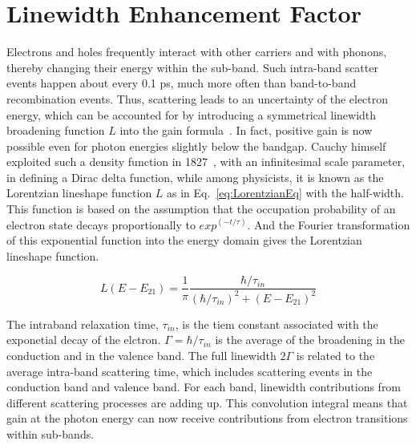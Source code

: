 \section{Linewidth Enhancement Factor} \label{Linewidth}

Electrons and holes frequently interact with other carriers and with phonons,
thereby changing their energy within the sub-band. Such intra-band scatter
events happen about every 0.1 ps, much more often than band-to-band
recombination events. Thus, scattering leads to an uncertainty of the electron
energy, which can be accounted for by introducing a symmetrical linewidth
broadening function $L$ into the gain formula~\cite{Piprek:2013wu}.  In fact,
positive gain is now possible even for photon energies slightly below the
bandgap. Cauchy himself exploited such a density function in
1827~\cite{stigler2002statistics}, with an infinitesimal scale parameter, in
defining a Dirac delta function, while among physicists, it is known as the
Lorentzian lineshape function $L$ as in Eq.~\ref{eq:LorentzianEq} with the
half-width. This function is based on the assumption that the occupation
probability of an electron state decays proportionally to
${exp}^{(-{t}/{\tau})}$. And the Fourier transformation of this exponential
function into the energy domain gives the Lorentzian lineshape function.

\begin{equation}
L(E-E_{21})=\frac{1}{\pi}\frac{\hbar/\tau_{in}}{{(\hbar/\tau_{in})}^2+{(E-E_{21})}^2}
\label{eq:LorentzianEq}
\end{equation}

The intraband relaxation time, $\tau_{in}$, is the tiem constant associated
with the exponetial decay of the elctron. $\Gamma=\hbar/\tau_{in}$ is the
average of the broadening in the conduction and in the valence band. The full
linewidth $2\Gamma$ is related to the average intra-band scattering time, which
includes scattering events in the conduction band and valence band. For each
band, linewidth contributions from different scattering processes are adding
up. This convolution integral means that gain at the photon energy can now
receive contributions from electron transitions within sub-bands.

